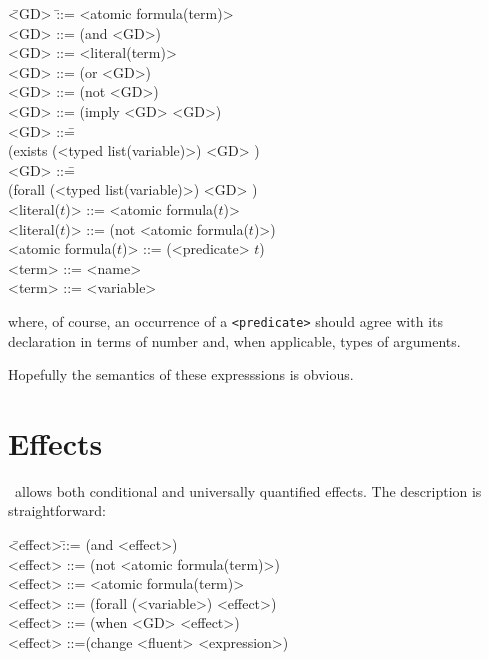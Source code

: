 \begin{tabtt}
\bump \= <GD> \hspace{3cm} \= ::= <atomic formula(term)> \+\\
  <GD> \>::= (and <GD>\zom) \\
  <GD> \> ::= <literal(term)> \\
  <GD> \> ::= (or  <GD>\zom) \\
  <GD>\> ::= (not <GD>) \\
  <GD>\> ::= (imply <GD> <GD>) \\
\smallskip
  <GD>\> ::=\=  \+\+\\
             (exists (<typed list(variable)>\zom) <GD> )\-\-\\ 
\smallskip
  <GD>\> ::=\= \+\+\\
            (forall (<typed list(variable)>\zom) <GD> ) \-\-\\  
  <literal($t$)> \>::= <atomic formula($t$)> \\
  <literal($t$)> \>::= (not <atomic formula($t$)>) \\
  <atomic formula($t$)> \>::= (<predicate> $t$\zom) \\
  <term> \> ::= <name> \\
  <term> \> ::= <variable> 
\end{tabtt}

\noindent where, of course, an occurrence of a {\tt <predicate>} should 
agree with its declaration in terms of number and, when applicable, types of
arguments.  

Hopefully the semantics of these expresssions is obvious.

    \section{Effects}
\label{eff}

\begin{sloppypar}
\lang\ allows both conditional and universally quantified effects.  The
description is straightforward:
\end{sloppypar}

\begin{nopagebreak}\begin{tabtt}
\bump \= <effect>\bump\=::= (and <effect>\zom) \+\\
  <effect> \> ::= (not <atomic formula(term)>) \\
  <effect> \>::= <atomic formula(term)>  \\
  <effect> \> ::= (forall (<variable>\zom) <effect>) \\
  <effect> \>::= (when <GD> <effect>) \\
  <effect> \>::=(change <fluent> <expression>)
\end{tabtt}\end{nopagebreak}

